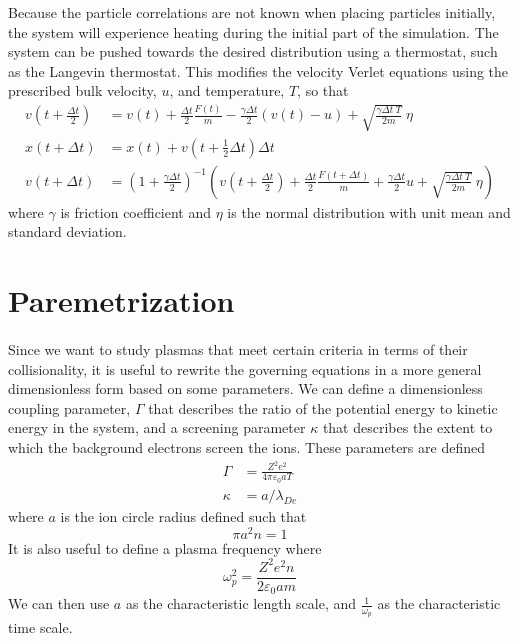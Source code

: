 \documentclass[11pt]{article}
\begin{document}
Because the particle correlations are not known when placing particles initially, the system will experience heating during the initial part of the simulation. The system can be pushed towards the desired distribution using a thermostat, such as the Langevin thermostat. This modifies the velocity Verlet equations using the prescribed bulk velocity, $u$, and temperature, $T$, so that
\begin{align*}
v(t+\frac{\Delta t}{2}) &= v(t) + \frac{\Delta t}{2}\frac{F(t)}{m} - \frac{\gamma\Delta t}{2}\left(v(t)-u\right) + \sqrt{\frac{\gamma\Delta t\:T}{2m}}\:\eta \\
x(t+\Delta t) &= x(t) + v(t+\frac{1}{2}\Delta t)\Delta t \\
v(t+\Delta t) &= \left(1 + \frac{\gamma\Delta t}{2}\right)^{-1} \left(v(t+\frac{\Delta t}{2}) +  \frac{\Delta t}{2}\frac{F(t+\Delta t)}{m} + \frac{\gamma\Delta t}{2}u + \sqrt{\frac{\gamma\Delta t \:T}{2m}}\:\eta\right)
\end{align*}
where $\gamma$ is friction coefficient and $\eta$ is the normal distribution with unit mean and standard deviation.

\section{Paremetrization}
\paragraph{}
Since we want to study plasmas that meet certain criteria in terms of their collisionality, it is useful to rewrite the governing equations in a more general dimensionless form based on some parameters. We can define a dimensionless coupling parameter, $\Gamma$ that describes the ratio of the potential energy to kinetic energy in the system, and a screening parameter $\kappa$ that describes the extent to which the background electrons screen the ions. These parameters are defined
\begin{align*}
\Gamma &= \frac{Z^2e^2}{4\pi\varepsilon_0aT} \\
\kappa &= a/\lambda_{De}
\end{align*}
where $a$ is the ion circle radius defined such that
\begin{equation*}
\pi a^2n = 1
\end{equation*}
It is also useful to define a plasma frequency where
\begin{equation*}
\omega_p^2 = \frac{Z^2e^2n}{2\varepsilon_0am}
\end{equation*}
We can then use $a$ as the characteristic length scale, and $\frac{1}{\omega_p}$ as the characteristic time scale.
\end{document}
